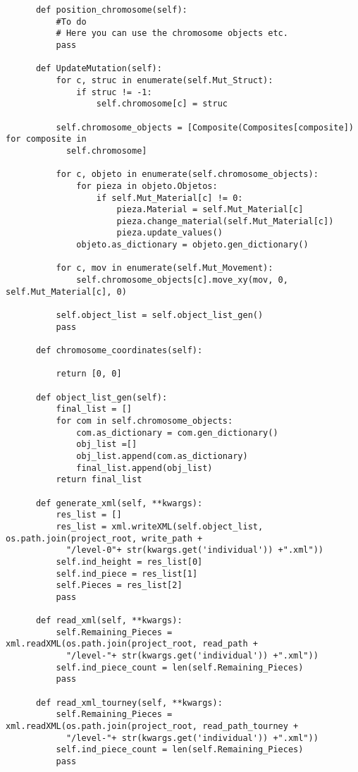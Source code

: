 \begin{verbatim}
      def position_chromosome(self):
          #To do
          # Here you can use the chromosome objects etc.
          pass
      
      def UpdateMutation(self):
          for c, struc in enumerate(self.Mut_Struct):
              if struc != -1:
                  self.chromosome[c] = struc

          self.chromosome_objects = [Composite(Composites[composite]) for composite in 
            self.chromosome]

          for c, objeto in enumerate(self.chromosome_objects):
              for pieza in objeto.Objetos:
                  if self.Mut_Material[c] != 0:
                      pieza.Material = self.Mut_Material[c]
                      pieza.change_material(self.Mut_Material[c])
                      pieza.update_values()
              objeto.as_dictionary = objeto.gen_dictionary()

          for c, mov in enumerate(self.Mut_Movement):
              self.chromosome_objects[c].move_xy(mov, 0, self.Mut_Material[c], 0)

          self.object_list = self.object_list_gen()
          pass
      
      def chromosome_coordinates(self):
          
          return [0, 0]
      
      def object_list_gen(self):
          final_list = []
          for com in self.chromosome_objects:
              com.as_dictionary = com.gen_dictionary()
              obj_list =[]
              obj_list.append(com.as_dictionary)
              final_list.append(obj_list)
          return final_list
      
      def generate_xml(self, **kwargs):
          res_list = []
          res_list = xml.writeXML(self.object_list, os.path.join(project_root, write_path + 
            "/level-0"+ str(kwargs.get('individual')) +".xml"))
          self.ind_height = res_list[0]
          self.ind_piece = res_list[1]
          self.Pieces = res_list[2]
          pass
      
      def read_xml(self, **kwargs):
          self.Remaining_Pieces = xml.readXML(os.path.join(project_root, read_path + 
            "/level-"+ str(kwargs.get('individual')) +".xml"))
          self.ind_piece_count = len(self.Remaining_Pieces)
          pass
      
      def read_xml_tourney(self, **kwargs):
          self.Remaining_Pieces = xml.readXML(os.path.join(project_root, read_path_tourney + 
            "/level-"+ str(kwargs.get('individual')) +".xml"))
          self.ind_piece_count = len(self.Remaining_Pieces)
          pass
      

\end{verbatim}
